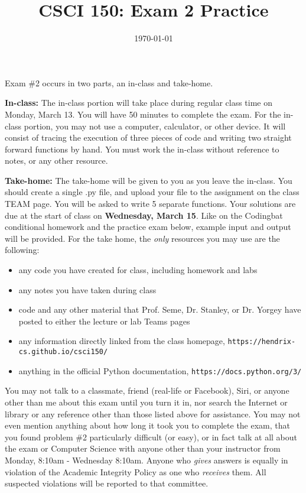 \documentclass{article}
\newcommand{\vs}{\vspace{0.1in}}
\begin{document}
\title{CSCI 150: Exam 2 Practice}
\date{\today}

\maketitle

  Exam \#2 occurs in two parts, an in-class and take-home.

\vs

\vs

\textbf{In-class:} The in-class portion will take place during regular class time on Monday, March 13. You will have 50 minutes to complete the exam. For the in-class portion, you may not use a computer, calculator, or other device. It will consist of tracing the execution of three pieces of code and writing two straight forward functions by hand. You must work the in-class without reference to notes, or any other resource.

\vs

\textbf{Take-home:} The take-home will be given to you as you leave the in-class. You should create a single .py file, and upload your file to the assignment on the class TEAM page. You will be asked to write 5 separate functions. Your solutions are due at the start of class on \textbf{Wednesday, March 15}.  Like on the Codingbat conditional homework and the practice exam below, example input and output will be provided. For the take home, the \emph{only} resources you may use are the following:
\begin{itemize}
  \item  any code you have created for class, including homework and labs
  \item  any notes you have taken during class
  \item  code and any other material that Prof. Seme, Dr. Stanley, or Dr. Yorgey have posted to either the lecture or lab Teams pages
  \item  any information directly linked from the class homepage, \texttt{https://hendrix-cs.github.io/csci150/}
  \item  anything in the official Python documentation, \texttt{https://docs.python.org/3/}
\end{itemize}

 You may not talk to a classmate, friend (real-life or Facebook), Siri, or anyone other than me about this exam until you turn it in, nor search the Internet or library or any reference other than those listed above for assistance.  You may not even mention anything about how long it took you to complete the exam, that you found problem \#2 particularly difficult (or easy), or in fact talk at all about the exam or Computer Science with anyone other than your instructor from Monday, 8:10am - Wednesday 8:10am.  Anyone who \emph{gives} answers is equally in violation of the Academic Integrity Policy as one who \emph{receives} them. All suspected violations will be reported to that committee.
\end{document}
